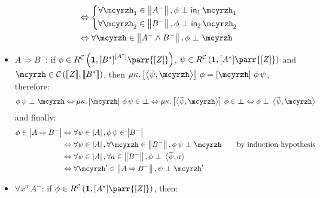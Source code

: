 \documentclass{CSML}
\newcommand*\SortA{\sigma}
\newcommand*\LogSortedTerm[2]{#1^{#2}}
\newcommand*\LogVarA{x}
\newcommand*\LogNeg[1]{{#1^-}}
\newcommand*\LogImp{\mathbin{\Rightarrow}}
\newcommand*\LogAnd{\mathbin{\wedge}}
\newcommand*\LogFormA{A}
\newcommand*\LogFormB{B}
\newcommand*\LmSortExtract{Z}
\newcommand*\LmPair[2]{\left\langle#1,#2\right\rangle}
\newcommand*\LamCPS[1]{\raisebox{0pt}[.9\height]{$\widetilde{\raisebox{0pt}[.9\height]{$#1$}}$}}
\newcommand*\LamIn{\mathsf{in}}
\newcommand*\LmInterpForm[1]{{#1}^*}
\newcommand*\CatC{\mathcal{C}}
\newcommand*\CatR{R}
\newcommand*\CatRC{\CatExp{\CatR}{\CatC}}
\newcommand*\CatExp[2]{#1^{#2}}
\newcommand*\CatPar\parr
\newcommand*\CatRCHomA\phi
\newcommand*\CatRCHomB\psi
\newcommand*\CatCHomA\mcyrzh
\newcommand*\CatTerm{\mathbf{1}}
\newcommand*\CatInterpSortNeg[1]{{\left\llbracket#1\right\rrbracket}}
\newcommand*\CatInterpSort[1]{{\left[#1\right]}}
\newcommand*\RealValNeg[1]{\left\|#1\right\|}
\newcommand*\RealVal[1]{\left|#1\right|}
\newcommand*\RealBot{{\bot\mkern-11mu\bot}}
\begin{document}
\begin{itemize}
\begin{align*}
&\Leftrightarrow\left\{\begin{gathered}\forall\CatCHomA_1\in\RealValNeg{\LogNeg{\LogFormA}},\CatRCHomA\ \bot\ \LamIn_1\,\CatCHomA_1\\\forall\CatCHomA_2\in\RealValNeg{\LogNeg{\LogFormB}},\CatRCHomA\ \bot\ \LamIn_2\,\CatCHomA_2\end{gathered}\right.\\
&\Leftrightarrow\forall\CatCHomA\in\RealValNeg{\LogNeg{\LogFormA}\LogAnd\LogNeg{\LogFormB}},\CatRCHomA\ \bot\ \CatCHomA
\end{align*}
\item$\LogFormA\LogImp\LogNeg{\LogFormB}$: if $\CatRCHomA\in\CatRC\left(\CatTerm,\CatExp{\CatInterpSort{\LmInterpForm{\LogFormB}}}{\CatInterpSort{\LmInterpForm{\LogFormA}}}\CatPar\CatInterpSort{\LmSortExtract}\right)$, $\CatRCHomB\in\CatRC\left(\CatTerm,\CatInterpSort{\LmInterpForm{\LogFormA}}\CatPar\CatInterpSort{\LmSortExtract}\right)$ and $\CatCHomA\in\CatC\left(\CatInterpSortNeg{\LmSortExtract},\CatInterpSortNeg{\LmInterpForm{\LogFormB}}\right)$, then $\mu\kappa.\left[\LmPair{\LamCPS{\CatRCHomB}}{\CatCHomA}\right]\,\CatRCHomA=\left[\CatCHomA\right]\,\CatRCHomA\,\CatRCHomB$, therefore:
$$\CatRCHomA\,\CatRCHomB\ \bot\ \CatCHomA\Leftrightarrow\mu\kappa.\left[\CatCHomA\right]\,\CatRCHomA\,\CatRCHomB\in\RealBot\Leftrightarrow\mu\kappa.\left[\LmPair{\LamCPS{\CatRCHomB}}{\CatCHomA}\right]\,\CatRCHomA\in\RealBot\Leftrightarrow\CatRCHomA\ \bot\ \LmPair{\LamCPS{\CatRCHomB}}{\CatCHomA}$$
and finally:
\begin{align*}
\CatRCHomA\in\RealVal{\LogFormA\LogImp\LogNeg{\LogFormB}}&\Leftrightarrow\forall\CatRCHomB\in\RealVal{\LogFormA},\CatRCHomA\,\CatRCHomB\in\RealVal{\LogNeg{\LogFormB}}\\
&\Leftrightarrow\forall\CatRCHomB\in\RealVal{\LogFormA},\forall\CatCHomA\in\RealValNeg{\LogNeg{\LogFormB}},\CatRCHomA\,\CatRCHomB\ \bot\ \CatCHomA\qquad\text{by induction hypothesis}\\
&\Leftrightarrow\forall\CatRCHomB\in\RealVal{\LogFormA},\forall a\in\RealValNeg{\LogNeg{\LogFormB}},\CatRCHomA\ \bot\ \LmPair{\LamCPS{\CatRCHomB}}{a}\\
&\Leftrightarrow\forall\CatCHomA'\in\RealValNeg{\LogFormA\LogImp\LogNeg{\LogFormB}},\CatRCHomB\ \bot\ \CatCHomA'
\end{align*}
\item$\forall\LogSortedTerm{\LogVarA}{\SortA}\,\LogNeg{\LogFormA}$: if $\CatRCHomA\in\CatRC\left(\CatTerm,\CatInterpSort{\LmInterpForm{\LogFormA}}\CatPar\CatInterpSort{\LmSortExtract}\right)$, then:

\end{itemize}
\end{document}

